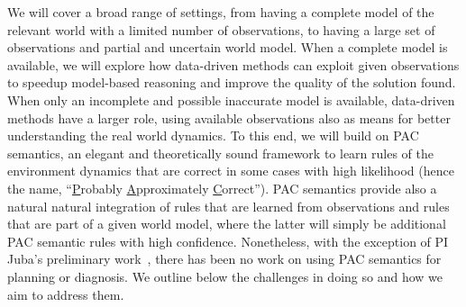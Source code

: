 \documentclass[12pt]{article}
\newcommand{\note}[1]{\textbf{\textit{#1}}}
\begin{document}
We will cover a broad range of settings, from having a complete model of the relevant world with a limited  number of observations, to having a large set of observations and partial and uncertain world model. When a complete model is available, we will explore how data-driven methods can exploit given observations to speedup model-based reasoning and
improve the quality of the solution found. 
When only an incomplete and possible inaccurate model is available, data-driven methods have a larger role, using available observations also as means for better understanding the real world dynamics. To this end, we will build on PAC semantics, an elegant and theoretically sound framework to learn rules of the environment dynamics that are correct in some cases with high likelihood (hence the name, ``{\underline P}robably {\underline A}pproximately {\underline C}orrect''). PAC semantics provide also a natural natural integration of rules that are learned from observations and rules that are part of a given world model, where the latter will simply be  additional PAC semantic rules with high confidence. Nonetheless, with the exception of PI Juba's preliminary work~\cite{juba2016jmlr,juba2016aaai,zhang2017aaai}, there has been no work on using PAC semantics for planning or diagnosis. We outline below the challenges in doing so and how we aim to address them. 

%


\end{document}
